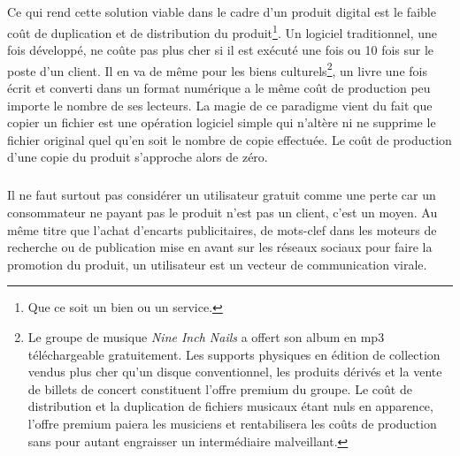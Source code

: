 \documentclass[11pt, a4paper ]{article}
\begin{document}
\begin{spacing}{1.5}
\subparagraph{}
Ce qui rend cette solution viable dans le cadre d'un produit digital est le faible coût de duplication et de distribution du produit\footnote{Que ce soit un bien ou un service.}. Un logiciel traditionnel, une fois développé, ne coûte pas plus cher si il est exécuté une fois ou 10 fois sur le poste d'un client. Il en va de même pour les biens culturels\footnote{Le groupe de musique \emph{Nine Inch Nails} a offert son album en mp3 téléchargeable gratuitement. Les supports physiques en édition de collection vendus plus cher qu'un disque conventionnel, les produits dérivés et la vente de billets de concert constituent l'offre premium du groupe. Le coût de distribution et la duplication de fichiers musicaux étant nuls en apparence, l'offre premium paiera les musiciens et rentabilisera les coûts de production sans pour autant engraisser un intermédiaire malveillant.}, un livre une fois écrit et converti dans un format numérique a le même coût de production peu importe le nombre de ses lecteurs. La magie de ce paradigme vient du fait que copier un fichier est une opération logiciel simple qui n’altère ni ne supprime le fichier original quel qu’en soit le nombre de copie effectuée. Le coût de production d'une copie du produit s'approche alors de zéro.

\subparagraph{}
Il ne faut surtout pas considérer un utilisateur gratuit comme une perte car un consommateur ne payant pas le produit n'est pas un client, c'est un moyen. Au même titre que l'achat d’encarts publicitaires, de mots-clef dans les moteurs de recherche ou de publication mise en avant sur les réseaux sociaux pour faire la promotion du produit, un utilisateur est un vecteur de communication virale.




\end{spacing}
\end{document}
